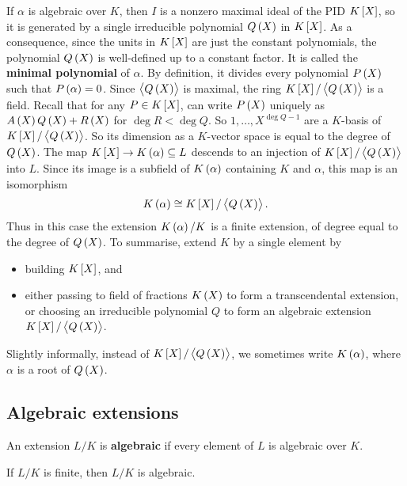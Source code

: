 If $ \alpha $ is algebraic over $ K $, then $ I $ is a nonzero maximal ideal of the PID $ K\sbr{X} $, so it is generated by a single irreducible polynomial $ Q\br{X} $ in $ K\sbr{X} $. As a consequence, since the units in $ K\sbr{X} $ are just the constant polynomials, the polynomial $ Q\br{X} $ is well-defined up to a constant factor. It is called the \textbf{minimal polynomial} of $ \alpha $. By definition, it divides every polynomial $ P\br{X} $ such that $ P\br{\alpha} = 0 $. Since $ \abr{Q\br{X}} $ is maximal, the ring $ K\sbr{X} / \abr{Q\br{X}} $ is a field. Recall that for any $ P \in K\sbr{X} $, can write $ P\br{X} $ uniquely as $ A\br{X}Q\br{X} + R\br{X} $ for $ \deg R < \deg Q $. So $ 1, \dots, X^{\deg Q - 1} $ are a $ K $-basis of $ K\sbr{X} / \abr{Q\br{X}} $. So its dimension as a $ K $-vector space is equal to the degree of $ Q\br{X} $. The map $ K\sbr{X} \to K\br{\alpha} \subseteq L $ descends to an injection of $ K\sbr{X} / \abr{Q\br{X}} $ into $ L $. Since its image is a subfield of $ K\br{\alpha} $ containing $ K $ and $ \alpha $, this map is an isomorphism
$$ K\br{\alpha} \cong K\sbr{X} / \abr{Q\br{X}}. $$
Thus in this case the extension $ K\br{\alpha} / K $ is a finite extension, of degree equal to the degree of $ Q\br{X} $. To summarise, extend $ K $ by a single element by
\begin{itemize}
\item building $ K\sbr{X} $, and
\item either passing to field of fractions $ K\br{X} $ to form a transcendental extension, or choosing an irreducible polynomial $ Q $ to form an algebraic extension $ K\sbr{X} / \abr{Q\br{X}} $.
\end{itemize}
Slightly informally, instead of $ K\sbr{X} / \abr{Q\br{X}} $, we sometimes write $ K\br{\alpha} $, where $ \alpha $ is a root of $ Q\br{X} $.

\pagebreak

\subsection{Algebraic extensions}

\begin{definition}
An extension $ L / K $ is \textbf{algebraic} if every element of $ L $ is algebraic over $ K $.
\end{definition}

\begin{proposition}
If $ L / K $ is finite, then $ L / K $ is algebraic.
\end{proposition}

